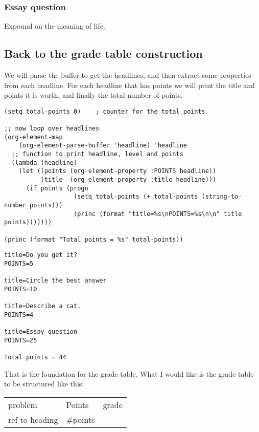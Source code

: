 \documentclass[11pt]{article}
\begin{document}
\subsubsection{Essay question}
\label{sec-1-1-3}
Expound on the meaning of life.
 \vspace{3cm} 
\subsection{Back to the grade table construction}
\label{sec-1-2}

We will parse the buffer to get the headlines, and then extract some properties from each headline. For each headline that has points we will print the title and points it is worth,  and finally the total number of points.

\begin{verbatim}
(setq total-points 0)    ; counter for the total points

;; now loop over headlines
(org-element-map 
    (org-element-parse-buffer 'headline) 'headline 
  ;; function to print headline, level and points
  (lambda (headline) 
    (let ((points (org-element-property :POINTS headline))
          (title  (org-element-property :title headline)))
      (if points (progn
                   (setq total-points (+ total-points (string-to-number points)))
                   (princ (format "title=%s\nPOINTS=%s\n\n" title points)))))))

(princ (format "Total points = %s" total-points))
\end{verbatim}

\begin{verbatim}
title=Do you get it?
POINTS=5

title=Circle the best answer
POINTS=10

title=Describe a cat.
POINTS=4

title=Essay question
POINTS=25

Total points = 44
\end{verbatim}

That is the foundation for the grade table. What I would like is the grade table to be structured like this:

\begin{center}
\begin{tabular}{lll}
problem & Points & grade\\
ref to heading & \#points & \\
\end{tabular}
\end{center}
\end{document}
